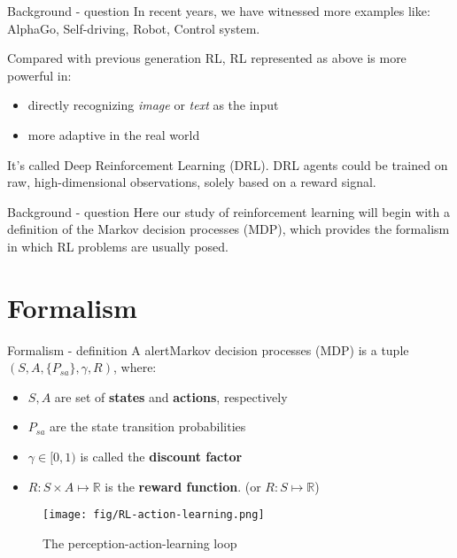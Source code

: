 \documentclass[10pt]{beamer}
\begin{document}
\begin{frame}[fragile]{Background - question}
  In recent years, we have witnessed more examples like: AlphaGo, Self-driving, Robot, Control system.

  Compared with previous generation RL, RL represented as above is more powerful in:
  \begin{itemize}
    \item directly recognizing \emph{image} or \emph{text} as the input
    \item more adaptive in the real world
  \end{itemize}

  It's called \alert{Deep Reinforcement Learning} (DRL). DRL agents could be trained on raw, high-dimensional observations, solely based on a reward signal.
\end{frame}

\begin{frame}[fragile]{Background - question}
  Here our study of reinforcement learning will begin with a definition of
the \alert{Markov decision processes} (MDP), which provides the formalism in
which RL problems are usually posed.
\end{frame}

\section{Formalism}

\begin{frame}{Formalism - definition}
  A alert{Markov decision processes} (MDP) is a tuple $(S, A, \{P_{sa}\}, \gamma, R)$, where:
  \begin{itemize}
    \item $S, A$ are set of \textbf{states} and \textbf{actions}, respectively
    \item $P_{sa}$ are the state transition probabilities
    \item $\gamma\in [0, 1)$ is called the \textbf{discount factor}
    \item $R : S \times A \mapsto \mathbb{R}$ is the \textbf{reward function}. (or $R : S \mapsto \mathbb{R}$)
  \end{itemize}

	\begin{figure}[htbp]
    \centering
    \texttt{[image: fig/RL-action-learning.png]}
    \caption{The perception-action-learning loop}
  \end{figure}

\end{frame}
\end{document}
